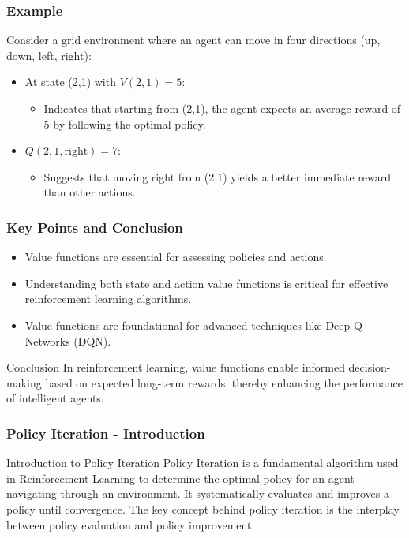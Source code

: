 \documentclass[aspectratio=169]{beamer}
\begin{document}
\begin{frame}[fragile]
    \frametitle{Example}
    Consider a grid environment where an agent can move in four directions (up, down, left, right):
    
    \begin{itemize}
        \item At state (2,1) with \(V(2,1) = 5\):
        \begin{itemize}
            \item Indicates that starting from (2,1), the agent expects an average reward of 5 by following the optimal policy.
        \end{itemize}
        
        \item \(Q(2,1, \text{right}) = 7\):
        \begin{itemize}
            \item Suggests that moving right from (2,1) yields a better immediate reward than other actions.
        \end{itemize}
    \end{itemize}
\end{frame}

\begin{frame}[fragile]
    \frametitle{Key Points and Conclusion}
    \begin{itemize}
        \item Value functions are essential for assessing policies and actions.
        \item Understanding both state and action value functions is critical for effective reinforcement learning algorithms.
        \item Value functions are foundational for advanced techniques like Deep Q-Networks (DQN).
    \end{itemize}

    \begin{block}{Conclusion}
        In reinforcement learning, value functions enable informed decision-making based on expected long-term rewards, thereby enhancing the performance of intelligent agents.
    \end{block}
\end{frame}

\begin{frame}[fragile]
    \frametitle{Policy Iteration - Introduction}
    \begin{block}{Introduction to Policy Iteration}
        Policy Iteration is a fundamental algorithm used in Reinforcement Learning to determine the optimal policy for an agent navigating through an environment.
        It systematically evaluates and improves a policy until convergence. The key concept behind policy iteration is the interplay between policy evaluation and policy improvement.
    \end{block}
\end{frame}
\end{document}
